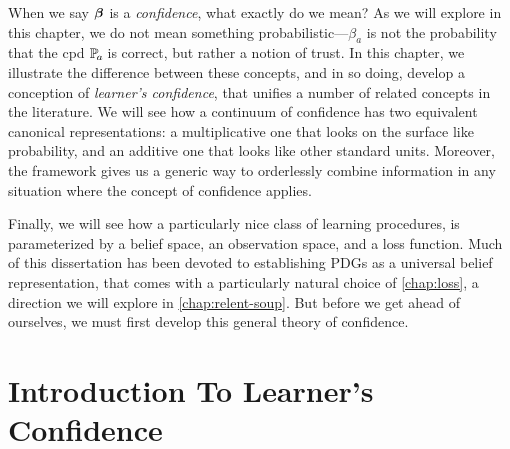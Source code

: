     \label{chap:conf}

When we say $\boldsymbol\beta$ is a \emph{confidence}, what exactly do we mean? 
As we will explore in this chapter, we do not mean something probabilistic---$\beta_a$ is not the probability that the cpd $\p_a$ is correct, but rather a notion of trust. 
In this chapter, we illustrate the difference between these concepts, and in so doing, develop a conception of \emph{learner's confidence}, that unifies a number of related concepts in the literature. 
We will see how a continuum of confidence has two equivalent canonical representations: a multiplicative one that looks on the surface like probability, and an additive one that looks like other standard units. 
Moreover, the framework gives us a generic way to orderlessly combine information in any situation where the concept of confidence applies. 

Finally, we will see how a particularly nice class of learning procedures, is parameterized by a belief space, an observation space, and a loss function. 
Much of this dissertation has been devoted to establishing PDGs as a universal belief representation, that comes with a particularly natural choice of \cref{chap:loss}, a direction we will explore in \cref{chap:relent-soup}. 
But before we get ahead of ourselves, we must first develop this general theory of confidence.


\section{Introduction To Learner's Confidence}
\def\stmt{$A$}




